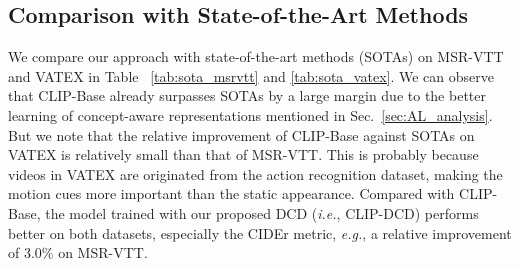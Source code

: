 \documentclass[runningheads]{llncs}
\newcommand\eg{\textit{e.g.}}
\newcommand\ie{\textit{i.e.}}
\begin{document}
\begin{table*}[t]
\begin{floatrow}

\vspace{-10pt}
\end{floatrow}
\end{table*}


\subsection{Comparison with State-of-the-Art Methods}
\label{sec:comparison_with_SOTA}
We compare our approach with state-of-the-art methods (SOTAs) on MSR-VTT and VATEX in Table ~\ref{tab:sota_msrvtt} and \ref{tab:sota_vatex}. We can observe that CLIP-Base already surpasses SOTAs by a large margin due to the better learning of concept-aware representations mentioned in Sec.~\ref{sec:AL_analysis}. But we note that the relative improvement of CLIP-Base against SOTAs on VATEX is relatively small than that of MSR-VTT. This is probably because videos in VATEX are originated from the action recognition dataset, making the motion cues more important than the static appearance. Compared with CLIP-Base, the model trained with our proposed DCD (\ie{}, CLIP-DCD) performs better on both datasets, especially the CIDEr metric, \eg{}, a relative improvement of 3.0\% on MSR-VTT. 
\end{document}
